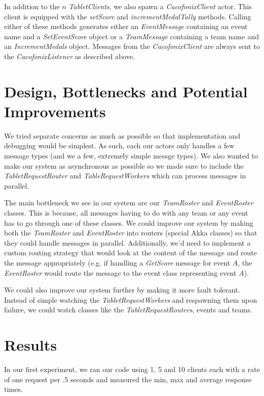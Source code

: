 \documentclass[11pt]{article}
\begin{document}
In addition to the $n$ \emph{TabletClients}, we also spawn a
\emph{CacofonixClient} actor.  This client is equipped with the
\emph{setScore} and \emph{incrementMedalTally} methods.  Calling
either of these methods generates either an \emph{EventMessage}
containing an event name and a \emph{SetEventScore} object or a
\emph{TeamMessage} containing a team name and an
\emph{IncrementMedals} object.  Messages from the
\emph{CacofonixClient} are always sent to the \emph{CacofonixListener}
as described above.

\section{Design, Bottlenecks and Potential Improvements}
We tried separate concerns as much as possible so that implementation
and debugging would be simplest.  As such, each our actors only
handles a few message types (and we a few, extremely simple
messge types).  We also wanted to make our system as
asynchronous as possible so we made sure to include the
\emph{TabletRequestRouter} and \emph{TableRequestWorkers} which can
process messages in parallel.

The main bottleneck we see in our system are our \emph{TeamRoster} and
\emph{EventRoster} classes.  This is because, all messages having to
do with any team or any event has to go through one of these classes.
We could improve our system by making both the \emph{TeamRoster} and
\emph{EventRoster} into routers (special Akka classes) so that they
could handle messages in parallel.  Additionally, we'd need to
implement a custom routing strategy that would look at the content of
the message and route the message appropriately (e.g. if handling a
\emph{GetScore} message for event $A$, the \emph{EventRoster} would
route the message to the event class representing event $A$).

We could also improve our system further by making it more fault
tolerant.  Instead of simple watching the \emph{TabletRequestWorkers}
and respawning them upon failure, we could watch classes like the
\emph{TabletRequestRouters}, events and teams.

\section{Results}
In our first experiment, we ran our code using 1, 5 and 10 clients
each with a rate of one request per .5 seconds and measured the min,
max and average response times.
\end{document}
